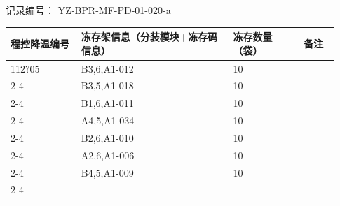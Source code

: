 \documentclass[UTF8,10pt,a4paper,fontset=fandol]{ctexart}
\newcommand{\fieldvalue}[1]{#1}
\newcommand{\handwritten}[1]{#1}
\begin{document}
\vspace{0.4em}

\noindent
记录编号：%
\fieldvalue{YZ-BPR-MF-PD-01-020-a}

\vspace{0.4em}

\noindent
\begin{tabular}{|p{0.20\linewidth}|p{0.43\linewidth}|p{0.20\linewidth}|p{0.10\linewidth}|}
\hline
\centering 程控降温编号 &
\centering 冻存架信息（分装模块+冻存码信息） &
\centering 冻存数量（袋） &
\centering 备注
\tabularnewline
\hline

\fieldvalue{\handwritten{112?05}} &
\fieldvalue{\handwritten{B3,6,A1-012}} &
\fieldvalue{\handwritten{10}} &
\tabularnewline
\cline{2-4}

&
\fieldvalue{\handwritten{B3,5,A1-018}} &
\fieldvalue{\handwritten{10}} &
\tabularnewline
\cline{2-4}

&
\fieldvalue{\handwritten{B1,6,A1-011}} &
\fieldvalue{\handwritten{10}} &
\tabularnewline
\cline{2-4}

&
\fieldvalue{\handwritten{A4,5,A1-034}} &
\fieldvalue{\handwritten{10}} &
\tabularnewline
\cline{2-4}

&
\fieldvalue{\handwritten{B2,6,A1-010}} &
\fieldvalue{\handwritten{10}} &
\tabularnewline
\cline{2-4}

&
\fieldvalue{\handwritten{A2,6,A1-006}} &
\fieldvalue{\handwritten{10}} &
\tabularnewline
\cline{2-4}

&
\fieldvalue{\handwritten{B4,5,A1-009}} &
\fieldvalue{\handwritten{10}} &
\tabularnewline
\cline{2-4}


\end{tabular}
\end{document}
